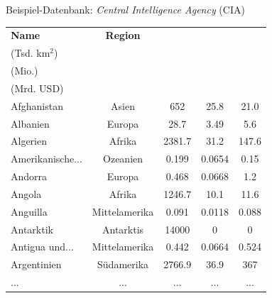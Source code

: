 \begin{frame}[fragile]{Beispiel-Datenbank: \textit{Central Intelligence Agency} (CIA)}
  \begin{table}
    \centering
    \tiny
    \begin{tabular}{lcccc}
      \toprule
      \textbf{Name}    & \textbf{Region} & \makecell{\textbf{Fläche}\\(Tsd. km$^2$)} & \makecell{\textbf{Einwohner}\\(Mio.)} & \makecell{\textbf{BIP}\\(Mrd. USD)} \\
      \midrule
      Afghanistan      & Asien           & 652             & 25.8               & 21.0         \\
      Albanien         & Europa          & 28.7            & 3.49               & 5.6          \\
      Algerien         & Afrika          & 2381.7          & 31.2               & 147.6        \\
      Amerikanische... & Ozeanien        & 0.199           & 0.0654             & 0.15         \\
      Andorra          & Europa          & 0.468           & 0.0668             & 1.2          \\
      Angola           & Afrika          & 1246.7          & 10.1               & 11.6         \\
      Anguilla         & Mittelamerika   & 0.091           & 0.0118             & 0.088        \\
      Antarktik        & Antarktis       & 14000           & 0                  & 0            \\
      Antigua und...   & Mittelamerika   & 0.442           & 0.0664             & 0.524        \\
      Argentinien      & Südamerika      & 2766.9          & 36.9               & 367          \\
      \midrule
      ...              & ...             & ...             & ...                & ...          \\
      \bottomrule
    \end{tabular}
  \end{table}
\end{frame}



